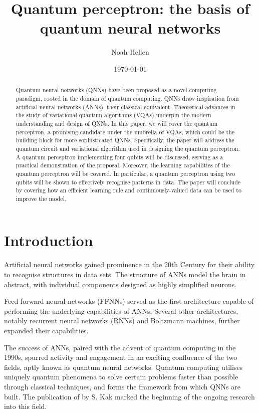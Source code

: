 \documentclass[twocolumn,superscriptaddress]{revtex4-1}
\begin{document}
\title{Quantum perceptron: the basis of quantum neural networks}
\author{Noah Hellen}
\date{\today}

\begin{abstract}

Quantum neural networks (QNNs) have been proposed as a novel computing paradigm, rooted in the domain of quantum computing. QNNs draw inspiration from artificial neural networks (ANNs), their classical equivalent. Theoretical advances in the study of variational quantum algorithms (VQAs) underpin the modern understanding and design of QNNs. In this paper, we will cover the quantum perceptron, a promising candidate under the umbrella of VQAs, which could be the building block for more sophisticated QNNs. Specifically, the paper will address the quantum circuit and variational algorithm used in designing the quantum perceptron. A quantum perceptron implementing four qubits will be discussed, serving as a practical demonstration of the proposal. Moreover, the learning capabilities of the quantum perceptron will be covered. In particular, a quantum perceptron using two qubits will be shown to effectively recognise patterns in data. The paper will conclude by covering how an efficient learning rule and continuously-valued data can be used to improve the model.

\end{abstract}

\maketitle

\section{Introduction} \label{introduction}

Artificial neural networks gained prominence in the 20th Century for their ability to recognise structures in data sets. The structure of ANNs model the brain in abstract, with individual components designed as highly simplified neurons. 

Feed-forward neural networks (FFNNs) served as the first architecture capable of performing the underlying capabilities of ANNs. Several other architectures, notably recurrent neural networks (RNNs) and Boltzmann machines, further expanded their capabilities.

The success of ANNs, paired with the advent of quantum computing in the 1990s, spurred activity and engagement in an exciting confluence of the two fields, aptly known as quantum neural networks. Quantum computing utilises uniquely quantum phenomena to solve certain problems faster than possible through classical techniques, and forms the framework from which QNNs are built. The publication of \cite{KAK1995143} by S. Kak marked the beginning of the ongoing research into this field.
\end{document}
